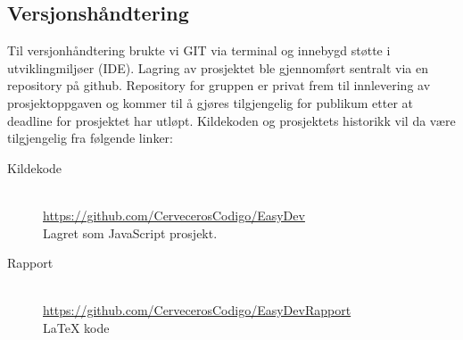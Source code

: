 \subsection{Versjonshåndtering}
Til versjonhåndtering brukte vi GIT via terminal og innebygd støtte i utviklingmiljøer (IDE). Lagring av prosjektet ble gjennomført sentralt via en repository på github. Repository for gruppen er privat frem til innlevering av prosjektoppgaven og kommer til å gjøres tilgjengelig for publikum etter at deadline for prosjektet har utløpt. Kildekoden og prosjektets historikk vil da være tilgjengelig fra følgende linker:

\begin{description}
\item[Kildekode]
\hfill \\
\url{https://github.com/CervecerosCodigo/EasyDev}
\\Lagret som JavaScript prosjekt.

\item[Rapport]
\hfill \\
\url{https://github.com/CervecerosCodigo/EasyDevRapport}
\\ \LaTeX{} kode
\end{description}
